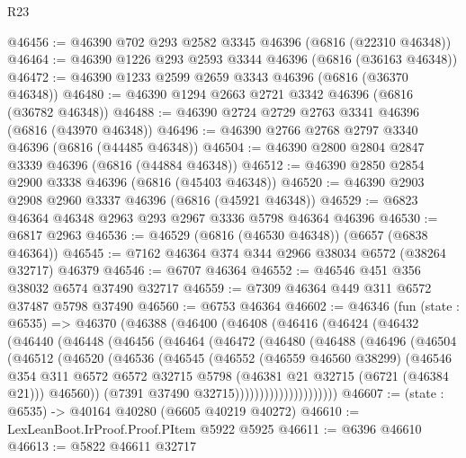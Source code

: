 \begin{lexlean}{R23}
\begin{coremodule}
@46456 := @46390 @702 @293 @2582 @3345 @46396 (@6816 (@22310 @46348))
@46464 := @46390 @1226 @293 @2593 @3344 @46396 (@6816 (@36163 @46348))
@46472 := @46390 @1233 @2599 @2659 @3343 @46396 (@6816 (@36370 @46348))
@46480 := @46390 @1294 @2663 @2721 @3342 @46396 (@6816 (@36782 @46348))
@46488 := @46390 @2724 @2729 @2763 @3341 @46396 (@6816 (@43970 @46348))
@46496 := @46390 @2766 @2768 @2797 @3340 @46396 (@6816 (@44485 @46348))
@46504 := @46390 @2800 @2804 @2847 @3339 @46396 (@6816 (@44884 @46348))
@46512 := @46390 @2850 @2854 @2900 @3338 @46396 (@6816 (@45403 @46348))
@46520 := @46390 @2903 @2908 @2960 @3337 @46396 (@6816 (@45921 @46348))
@46529 := @6823 @46364 @46348 @2963 @293 @2967 @3336 @5798 @46364 @46396
@46530 := @6817 @2963
@46536 := @46529 (@6816 (@46530 @46348)) (@6657 (@6838 @46364))
@46545 := @7162 @46364 @374 @344 @2966 @38034 @6572 (@38264 @32717) @46379
@46546 := @6707 @46364
@46552 := @46546 @451 @356 @38032 @6574 @37490 @32717
@46559 := @7309 @46364 @449 @311 @6572 @37487 @5798 @37490
@46560 := @6753 @46364
@46602 := @46346
    (fun (state : @6535) =>
    @46370
      (@46388
        (@46400
          (@46408
            (@46416
              (@46424
                (@46432
                  (@46440
                    (@46448
                      (@46456
                        (@46464
                          (@46472
                            (@46480
                              (@46488
                                (@46496
                                  (@46504
                                    (@46512
                                      (@46520
                                        (@46536
                                          (@46545
                                            (@46552
                                              (@46559 @46560 @38299)
                                              (@46546
                                                @354
                                                @311
                                                @6572
                                                @6572
                                                @32715
                                                @5798
                                                (@46381 @21 @32715 (@6721 (@46384 @21)))
                                                @46560))
                                            (@7391 @37490 @32715)))))))))))))))))))))
@46607 := (state : @6535) -> @40164 @40280 (@6605 @40219 @40272)
@46610 := LexLeanBoot.IrProof.Proof.PItem @5922 @5925
@46611 := @6396 @46610
@46613 := @5822 @46611 @32717

\end{coremodule}
\end{lexlean}
